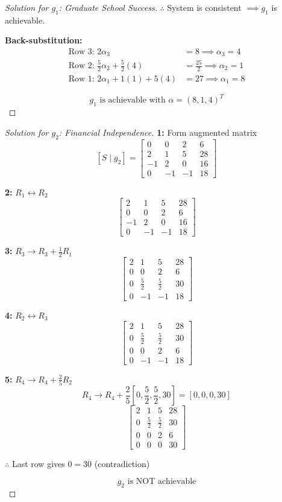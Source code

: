 \documentclass[12pt]{article}
\theoremstyle{definition}
\begin{document}
\begin{proof}[Solution for $g_1$: Graduate School Success]
$\therefore$ System is consistent $\implies g_1$ is achievable.

\textbf{Back-substitution:}
\begin{align*}
\text{Row 3: } 2\alpha_3 &= 8 \implies \alpha_3 = 4 \\
\text{Row 2: } \frac{5}{2}\alpha_2 + \frac{5}{2}(4) &= \frac{25}{2} \implies \alpha_2 = 1 \\
\text{Row 1: } 2\alpha_1 + 1(1) + 5(4) &= 27 \implies \alpha_1 = 8
\end{align*}

\[
\boxed{g_1 \text{ is achievable with } \alpha = (8, 1, 4)^T}
\]
\end{proof}

\begin{proof}[Solution for $g_2$: Financial Independence]

\textbf{1:} Form augmented matrix
\[
[S \mid g_2] = \left[\begin{array}{ccc|c}
0 & 0 & 2 & 6 \\
2 & 1 & 5 & 28 \\
-1 & 2 & 0 & 16 \\
0 & -1 & -1 & 18
\end{array}\right]
\]

\textbf{2:} $R_1 \leftrightarrow R_2$
\[
\left[\begin{array}{ccc|c}
2 & 1 & 5 & 28 \\
0 & 0 & 2 & 6 \\
-1 & 2 & 0 & 16 \\
0 & -1 & -1 & 18
\end{array}\right]
\]

\textbf{3:} $R_3 \to R_3 + \frac{1}{2}R_1$
\[
\left[\begin{array}{ccc|c}
2 & 1 & 5 & 28 \\
0 & 0 & 2 & 6 \\
0 & \frac{5}{2} & \frac{5}{2} & 30 \\
0 & -1 & -1 & 18
\end{array}\right]
\]

\textbf{4:} $R_2 \leftrightarrow R_3$
\[
\left[\begin{array}{ccc|c}
2 & 1 & 5 & 28 \\
0 & \frac{5}{2} & \frac{5}{2} & 30 \\
0 & 0 & 2 & 6 \\
0 & -1 & -1 & 18
\end{array}\right]
\]

\textbf{5:} $R_4 \to R_4 + \frac{2}{5}R_2$
\[
R_4 \to R_4 + \frac{2}{5}\left[0, \frac{5}{2}, \frac{5}{2}, 30\right] = \left[0, 0, 0, 30\right]
\]
\[
\left[\begin{array}{ccc|c}
2 & 1 & 5 & 28 \\
0 & \frac{5}{2} & \frac{5}{2} & 30 \\
0 & 0 & 2 & 6 \\
0 & 0 & 0 & 30
\end{array}\right]
\]

$\therefore$ Last row gives $0 = 30$ (contradiction)

\[
\boxed{g_2 \text{ is NOT achievable}}
\]
\end{proof}
\end{document}
